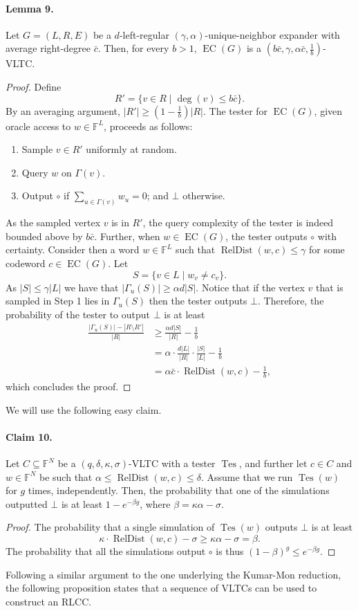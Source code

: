 \paragraph{Lemma 9.} Let $G=(L,R,E)$ be a $d$-left-regular $(\gamma,\alpha)$-unique-neighbor expander with average right-degree $\bar c$. Then, for every $b>1$, $\operatorname{EC}(G)$ is a $(b\bar c,\gamma,\alpha\bar c,\frac1b)$-VLTC.
\begin{proof}
Define
\[R'=\{v\in R\mid\deg(v)\le b\bar c\}.\]
By an averaging argument, $|R'|\ge(1-\frac1b)|R|$. The tester for $\operatorname{EC}(G)$, given oracle access to $w\in\mathbb F^L$, proceeds as follows:
\begin{enumerate}\item Sample $v\in R'$ uniformly at random.\item Query $w$ on $\Gamma(v)$.\item Output $\circ$ if $\sum_{u\in\Gamma(v)}w_u=0$; and $\bot$ otherwise.\end{enumerate}
As the sampled vertex $v$ is in $R'$, the query complexity of the tester is indeed bounded above by $b\bar c$. Further, when $w\in\operatorname{EC}(G)$, the tester outputs $\circ$ with certainty.
Consider then a word $w\in\mathbb F^L$ such that $\operatorname{RelDist}(w,c)\le\gamma$ for some codeword $c\in\operatorname{EC}(G)$. Let
\[S=\{v\in L\mid w_v\ne c_v\}.\]
As $|S|\le\gamma|L|$ we have that $|\Gamma_u(S)|\ge\alpha d|S|$. Notice that if the vertex $v$ that is sampled in Step 1 lies in $\Gamma_u(S)$ then the tester outputs $\bot$. Therefore, the probability of the tester to output $\bot$ is at least
\begin{align*}\frac{|\Gamma_u(S)|-|R\setminus R'|}{|R|}&\ge\frac{\alpha d|S|}{|R|}-\frac1b\\&=\alpha\cdot\frac{d|L|}{|R|}\cdot\frac{|S|}{|L|}-\frac1b\\&=\alpha\bar c\cdot\operatorname{RelDist}(w,c)-\frac1b,\end{align*}
which concludes the proof.
\end{proof}
We will use the following easy claim.
\paragraph{Claim 10.} Let $C\subseteq\mathbb F^N$ be a $(q,\delta,\kappa,\sigma)$-VLTC with a tester $\operatorname{Tes}$, and further let $c\in C$ and $w\in\mathbb F^N$ be such that $\alpha\le\operatorname{RelDist}(w,c)\le\delta$. Assume that we run $\operatorname{Tes}(w)$ for $g$ times, independently. Then, the probability that one of the simulations outputted $\bot$ is at least $1-e^{-\beta g}$, where $\beta=\kappa\alpha-\sigma$.
\begin{proof}
The probability that a single simulation of $\operatorname{Tes}(w)$ outputs $\bot$ is at least
\[\kappa\cdot\operatorname{RelDist}(w,c)-\sigma\ge\kappa\alpha-\sigma=\beta.\]
The probability that all the simulations output $\circ$ is thus $(1-\beta)^g\le e^{-\beta g}$.
\end{proof}
Following a similar argument to the one underlying the Kumar-Mon reduction, the following proposition states that a sequence of VLTCs can be used to construct an RLCC.
